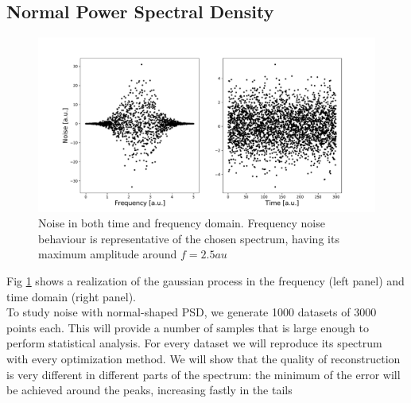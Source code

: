 \documentclass[twocolumn,showpacs,preprintnumbers,nofootinbib,prd,
superscriptaddress,10pt]{revtex4-1}
\begin{document}
\subsection{Normal Power Spectral Density}
\begin{figure}
    \centering
        \includegraphics[width = \linewidth]{Images/NormalPSD/NormalNoise.pdf}
    \caption{Noise in both time and frequency domain. Frequency noise behaviour is representative of the chosen spectrum, having its maximum amplitude around $f = 2.5 au$}
    \label{fig:noise}
\end{figure}
Fig \ref{fig:noise} shows a realization of the gaussian process in the frequency (left panel) and time domain (right panel).   \\ 
To study noise with normal-shaped PSD, we generate 1000 datasets of 3000 points each. This will provide a number of samples that is large enough to perform statistical analysis. For every dataset we will reproduce its spectrum with every optimization method. We will show that the quality of reconstruction is very different in different parts of the spectrum: the minimum of the error will be achieved around the peaks, increasing fastly in the tails
 \\ \\ 
\end{document}
